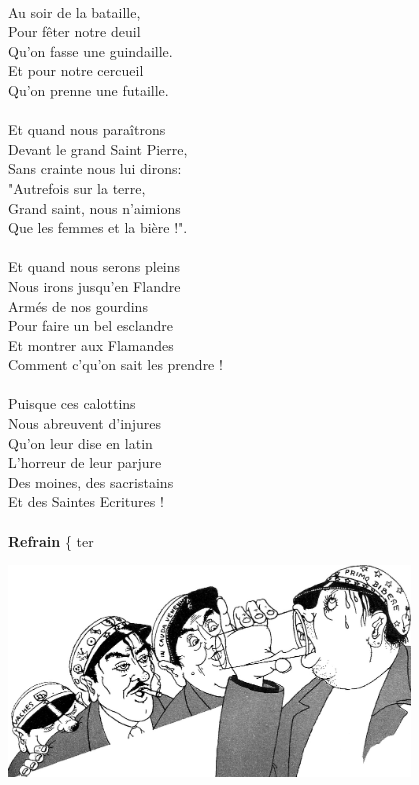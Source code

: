 \\Au soir de la bataille,
\\Pour fêter notre deuil
\\Qu'on fasse une guindaille.
\\Et pour notre cercueil
\\Qu'on prenne une futaille.
\\\\Et quand nous paraîtrons
\\Devant le grand Saint Pierre,
\\Sans crainte nous lui dirons:
\\"Autrefois sur la terre,
\\Grand saint, nous n'aimions
\\Que les femmes et la bière !".
\\\\Et quand nous serons pleins
\\Nous irons jusqu'en Flandre
\\Armés de nos gourdins
\\Pour faire un bel esclandre
\\Et montrer aux Flamandes
\\Comment c'qu'on sait les prendre !
\\\\Puisque ces calottins 
\\Nous abreuvent d'injures
\\Qu'on leur dise en latin
\\L'horreur de leur parjure
\\Des moines, des sacristains
\\Et des Saintes Ecritures ! 
\\\\\textbf{Refrain} \{ ter
\begin{center}
   \includegraphics[width=0.8\textwidth]{images/Wallon.jpg}
 \end{center}
\breakpage